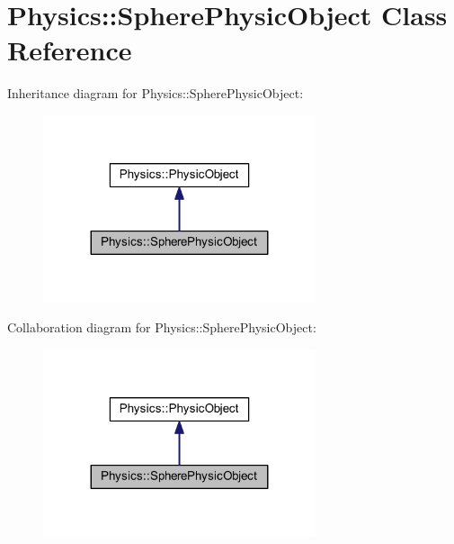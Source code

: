 \hypertarget{class_physics_1_1_sphere_physic_object}{}\section{Physics\+:\+:Sphere\+Physic\+Object Class Reference}
\label{class_physics_1_1_sphere_physic_object}


Inheritance diagram for Physics\+:\+:Sphere\+Physic\+Object\+:
\nopagebreak
\begin{figure}[H]
\begin{center}
\leavevmode
\includegraphics[width=227pt]{class_physics_1_1_sphere_physic_object__inherit__graph}
\end{center}
\end{figure}


Collaboration diagram for Physics\+:\+:Sphere\+Physic\+Object\+:
\nopagebreak
\begin{figure}[H]
\begin{center}
\leavevmode
\includegraphics[width=227pt]{class_physics_1_1_sphere_physic_object__coll__graph}
\end{center}
\end{figure}
